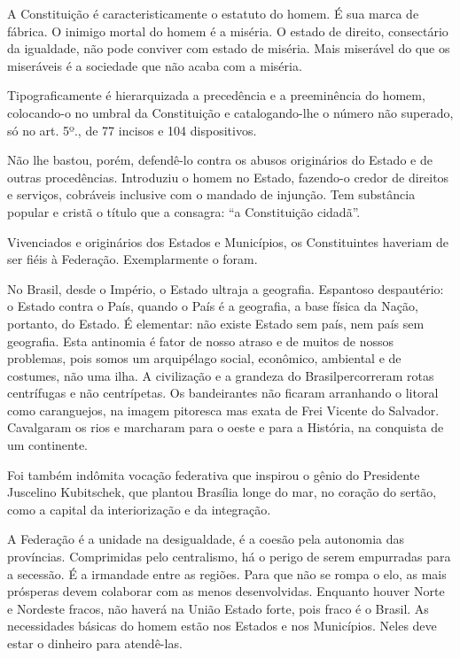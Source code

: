 A Constituição é caracteristicamente o estatuto do homem. É sua marca de
fábrica. O inimigo mortal do homem é a miséria. O estado de direito,
consectário da igualdade, não pode conviver com estado de miséria. Mais
miserável do que os miseráveis é a sociedade que não acaba com a
miséria.

Tipograficamente é hierarquizada a precedência e a preeminência do
homem, colocando-o no umbral da Constituição e catalogando-lhe o número
não superado, só no art. 5º., de 77 incisos e 104 dispositivos.

Não lhe bastou, porém, defendê-lo contra os abusos originários do Estado
e de outras procedências. Introduziu o homem no Estado, fazendo-o credor
de direitos e serviços, cobráveis inclusive com o mandado de injunção.
Tem substância popular e cristã o título que a consagra: ``a
Constituição cidadã''.

Vivenciados e originários dos Estados e Municípios, os Constituintes
haveriam de ser fiéis à Federação. Exemplarmente o foram.

No Brasil, desde o Império, o Estado ultraja a geografia. Espantoso
despautério: o Estado contra o País, quando o País é a geografia, a base
física da Nação, portanto, do Estado. É elementar: não existe Estado sem
país, nem país sem geografia. Esta antinomia é fator de nosso atraso e
de muitos de nossos problemas, pois somos um arquipélago social,
econômico, ambiental e de costumes, não uma ilha. A civilização e a
grandeza do Brasilpercorreram rotas centrífugas e não centrípetas. Os
bandeirantes não ficaram arranhando o litoral como caranguejos, na
imagem pitoresca mas exata de Frei Vicente do Salvador. Cavalgaram os
rios e marcharam para o oeste e para a História, na conquista de um
continente.

Foi também indômita vocação federativa que inspirou o gênio do
Presidente Juscelino Kubitschek, que plantou Brasília longe do mar, no
coração do sertão, como a capital da interiorização e da integração.

A Federação é a unidade na desigualdade, é a coesão pela autonomia das
províncias. Comprimidas pelo centralismo, há o perigo de serem
empurradas para a secessão. É a irmandade entre as regiões. Para que não
se rompa o elo, as mais prósperas devem colaborar com as menos
desenvolvidas. Enquanto houver Norte e Nordeste fracos, não haverá na
União Estado forte, pois fraco é o Brasil. As necessidades básicas do
homem estão nos Estados e nos Municípios. Neles deve estar o dinheiro
para atendê-las.

